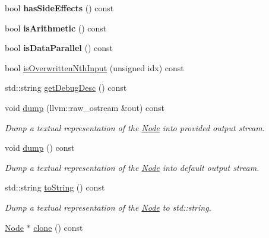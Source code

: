 \begin{DoxyCompactItemize}
bool {\bfseries has\+Side\+Effects} () const
\item 
\mbox{\label{classglow_1_1_node_a73a1c392e41b65c95833bd163927e504}} 
bool {\bfseries is\+Arithmetic} () const
\item 
\mbox{\label{classglow_1_1_node_a7f7fd2ca7503d3c8dc19bea6969cf440}} 
bool {\bfseries is\+Data\+Parallel} () const
\item 
bool \hyperlink{classglow_1_1_node_af8d2b902d958cac587be871b69df1bdf}{is\+Overwritten\+Nth\+Input} (unsigned idx) const
\item 
std\+::string \hyperlink{classglow_1_1_node_a0d828791f94bf520faf9c00c2f678135}{get\+Debug\+Desc} () const
\item 
\mbox{\label{classglow_1_1_node_a85a6afd99a1fa9ec17411c719f3170bc}} 
void \hyperlink{classglow_1_1_node_a85a6afd99a1fa9ec17411c719f3170bc}{dump} (llvm\+::raw\+\_\+ostream \&out) const
\begin{DoxyCompactList}\small\item\em Dump a textual representation of the \hyperlink{classglow_1_1_node}{Node} into provided output stream. \end{DoxyCompactList}\item 
\mbox{\label{classglow_1_1_node_ac0b8b415ec930f1c5444128c1825a1fd}} 
void \hyperlink{classglow_1_1_node_ac0b8b415ec930f1c5444128c1825a1fd}{dump} () const
\begin{DoxyCompactList}\small\item\em Dump a textual representation of the \hyperlink{classglow_1_1_node}{Node} into default output stream. \end{DoxyCompactList}\item 
\mbox{\label{classglow_1_1_node_a3a5d17c95876fa6030ddabbdb1cb88d6}} 
std\+::string \hyperlink{classglow_1_1_node_a3a5d17c95876fa6030ddabbdb1cb88d6}{to\+String} () const
\begin{DoxyCompactList}\small\item\em Dump a textual representation of the \hyperlink{classglow_1_1_node}{Node} to std\+::string. \end{DoxyCompactList}\item 
\hyperlink{classglow_1_1_node}{Node} $\ast$ \hyperlink{classglow_1_1_node_ae1e518ef19a5ddea3fff4d9a146c4f37}{clone} () const

\end{DoxyCompactItemize}
